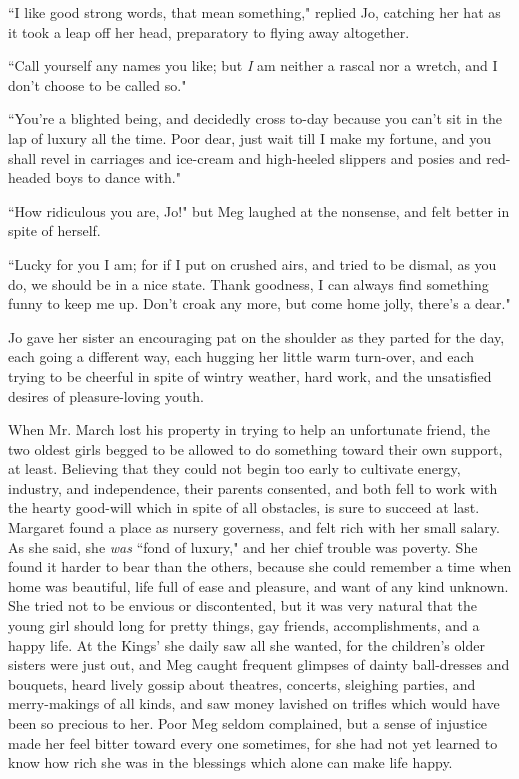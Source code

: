 ``I like good strong words, that mean something," replied Jo, catching
her hat as it took a leap off her head, preparatory to flying away
altogether.

``Call yourself any names you like; but \emph{I} am neither a rascal nor
a wretch, and I don't choose to be called so."

``You're a blighted being, and decidedly cross to-day
because you can't sit in the lap of luxury all the time.
Poor dear, just wait till I make my fortune, and you shall revel in
carriages and ice-cream and high-heeled slippers and posies and
red-headed boys to dance with."

``How ridiculous you are, Jo!" but Meg laughed at the nonsense, and felt
better in spite of herself.

``Lucky for you I am; for if I put on crushed airs, and tried to be
dismal, as you do, we should be in a nice state. Thank goodness, I can
always find something funny to keep me up. Don't croak
any more, but come home jolly, there's a dear."

Jo gave her sister an encouraging pat on the shoulder as they parted for
the day, each going a different way, each hugging her little warm
turn-over, and each trying to be cheerful in spite of wintry weather,
hard work, and the unsatisfied desires of pleasure-loving youth.

When Mr. March lost his property in trying to help an unfortunate
friend, the two oldest girls begged to be allowed to do something toward
their own support, at least. Believing that they could not begin too
early to cultivate energy, industry, and independence, their parents
consented, and both fell to work with the hearty good-will which in
spite of all obstacles, is sure to succeed at last. Margaret found a
place as nursery governess, and felt rich with her small salary. As she
said, she \emph{was} ``fond of luxury," and her chief trouble was
poverty. She found it harder to bear than the others, because she could
remember a time when home was beautiful, life full of ease and pleasure,
and want of any kind unknown. She tried not to be envious or
discontented, but it was very natural that the young girl should long
for pretty things, gay friends, accomplishments, and a happy life. At
the Kings' she daily saw all she wanted, for the
children's older sisters were just out, and Meg caught
frequent glimpses of dainty ball-dresses and bouquets, heard lively
gossip about theatres, concerts, sleighing parties, and merry-makings of
all kinds, and saw money lavished on trifles which would have been so
precious to her. Poor Meg seldom complained, but a sense of injustice
made her feel bitter toward every one sometimes, for she had not yet
learned to know how rich she was in the blessings which alone can make
life happy.

